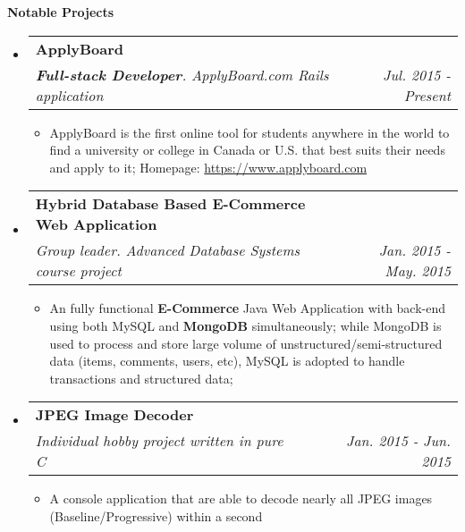 \documentclass[letterpaper,10pt]{article}
\makeatletter
\newcommand{\resitem}[1]{\item #1 \vspace{-2pt}}
\newcommand{\resheading}[1]{{\large \colorbox{mygrey}{\begin{minipage}{\textwidth}{\textbf{#1 \vphantom{p\^{E}}}}\end{minipage}}}}
\newcommand{\ressubheading}[4]{
\begin{tabular*}{7.0in}{l@{\extracolsep{\fill}}r}
		\textbf{#1} & #2 \\
		\textit{#3} & \textit{#4} \\
\end{tabular*}\vspace{-6pt}}
\makeatother
\begin{document}
\resheading{Notable Projects}
\begin{itemize}
\itemsep0em
\item
    \ressubheading{ApplyBoard}{}{\textbf{Full-stack Developer}. ApplyBoard.com Rails application}{Jul. 2015 - Present}
	\begin{itemize}
		\resitem{ApplyBoard is the first online tool for students anywhere in the world to find a university or college in Canada or U.S. that best suits their needs and apply to it; Homepage: \url{https://www.applyboard.com}}
	\end{itemize}
\item
	\ressubheading{Hybrid Database Based E-Commerce Web Application}{}{Group leader. Advanced Database Systems course project}{Jan. 2015 - May. 2015}
	\begin{itemize}
            \resitem{An fully functional \textbf{E-Commerce} Java Web Application with back-end using both MySQL and \textbf{MongoDB} simultaneously; while MongoDB is used to process and store large volume of unstructured/semi-structured data (items, comments, users, etc), MySQL is adopted to handle transactions and structured data;}
	\end{itemize}
\item
	\ressubheading{JPEG Image Decoder}{}{Individual hobby project written in pure C}{Jan. 2015 - Jun. 2015}
	\begin{itemize}
		\resitem{A console application that are able to decode nearly all JPEG images (Baseline/Progressive) within a second}
	\end{itemize}
	
\end{itemize}
\end{document}
